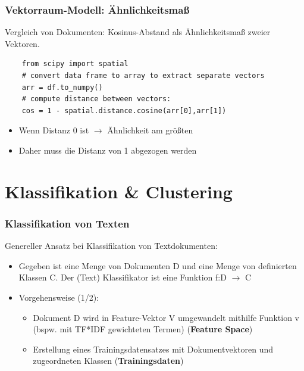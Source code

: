 \begin{frame}[fragile]
    \frametitle{Vektorraum-Modell: Ähnlichkeitsmaß}
    Vergleich von Dokumenten: Kosinus-Abstand als Ähnlichkeitsmaß zweier Vektoren.

    \begin{verbatim}
    from scipy import spatial
    # convert data frame to array to extract separate vectors
    arr = df.to_numpy()
    # compute distance between vectors:
    cos = 1 - spatial.distance.cosine(arr[0],arr[1])
    \end{verbatim}

    \begin{itemize}
    \item Wenn  Distanz 0 ist $\rightarrow$ Ähnlichkeit am größten 
    \item Daher muss die Distanz von 1 abgezogen werden
    \end{itemize}
\end{frame}
 

\section{Klassifikation \& Clustering}


\begin{frame}
    \frametitle{Klassifikation von Texten}

    Genereller Ansatz bei Klassifikation von Textdokumenten:
    \begin{itemize}
    \item Gegeben ist eine Menge von Dokumenten D und eine Menge von definierten Klassen C. Der (Text) Klassifikator ist eine Funktion f:D $\rightarrow$ C
    \item Vorgehensweise (1/2):
    \begin{itemize}
    \item Dokument D wird in Feature-Vektor V umgewandelt mithilfe Funktion v (bspw. mit TF*IDF gewichteten Termen) (\textbf{Feature Space})
    \item Erstellung eines Trainingsdatensatzes mit Dokumentvektoren und zugeordneten Klassen (\textbf{Trainingsdaten})
    \end{itemize}
    \end{itemize}
\end{frame}
    

